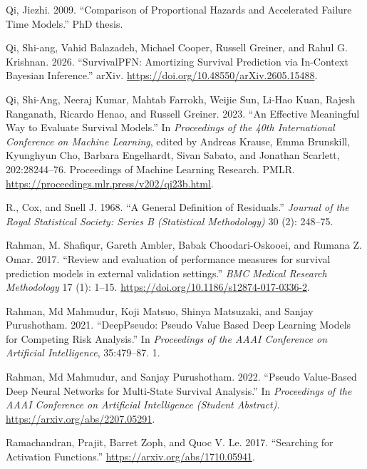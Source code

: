 \documentclass[
  letterpaper,
  krantz2]{style/krantz}
\newlength{\cslhangindent}
\newenvironment{CSLReferences}[2] %
 {\begin{list}{}{%
  \setlength{\itemindent}{0pt}
  \setlength{\leftmargin}{0pt}
  \setlength{\parsep}{0pt}
  \ifodd #1
   \setlength{\leftmargin}{\cslhangindent}
   \setlength{\itemindent}{-1\cslhangindent}
  \fi
  \setlength{\itemsep}{#2\baselineskip}}}
 {\end{list}}
\begin{document}
\begin{CSLReferences}{1}{0}
Qi, Jiezhi. 2009. {``{Comparison of Proportional Hazards and Accelerated
Failure Time Models}.''} PhD thesis.

Qi, Shi-ang, Vahid Balazadeh, Michael Cooper, Russell Greiner, and Rahul
G. Krishnan. 2026. {``{SurvivalPFN}: {Amortizing Survival Prediction}
via {In-Context Bayesian Inference}.''} arXiv.
\url{https://doi.org/10.48550/arXiv.2605.15488}.

Qi, Shi-Ang, Neeraj Kumar, Mahtab Farrokh, Weijie Sun, Li-Hao Kuan,
Rajesh Ranganath, Ricardo Henao, and Russell Greiner. 2023. {``An
Effective Meaningful Way to Evaluate Survival Models.''} In
\emph{Proceedings of the 40th International Conference on Machine
Learning}, edited by Andreas Krause, Emma Brunskill, Kyunghyun Cho,
Barbara Engelhardt, Sivan Sabato, and Jonathan Scarlett, 202:28244--76.
Proceedings of Machine Learning Research. PMLR.
\url{https://proceedings.mlr.press/v202/qi23b.html}.

R., Cox, and Snell J. 1968. {``{A General Definition of Residuals}.''}
\emph{Journal of the Royal Statistical Society: Series B (Statistical
Methodology)} 30 (2): 248--75.

Rahman, M. Shafiqur, Gareth Ambler, Babak Choodari-Oskooei, and Rumana
Z. Omar. 2017. {``{Review and evaluation of performance measures for
survival prediction models in external validation settings}.''}
\emph{BMC Medical Research Methodology} 17 (1): 1--15.
\url{https://doi.org/10.1186/s12874-017-0336-2}.

Rahman, Md Mahmudur, Koji Matsuo, Shinya Matsuzaki, and Sanjay
Purushotham. 2021. {``{DeepPseudo: Pseudo Value Based Deep Learning
Models for Competing Risk Analysis}.''} In \emph{Proceedings of the AAAI
Conference on Artificial Intelligence}, 35:479--87. 1.

Rahman, Md Mahmudur, and Sanjay Purushotham. 2022. {``{Pseudo
Value-Based Deep Neural Networks for Multi-State Survival Analysis}.''}
In \emph{Proceedings of the AAAI Conference on Artificial Intelligence
(Student Abstract)}. \url{https://arxiv.org/abs/2207.05291}.

Ramachandran, Prajit, Barret Zoph, and Quoc V. Le. 2017. {``{Searching
for Activation Functions}.''} \url{https://arxiv.org/abs/1710.05941}.


\end{CSLReferences}
\end{document}
